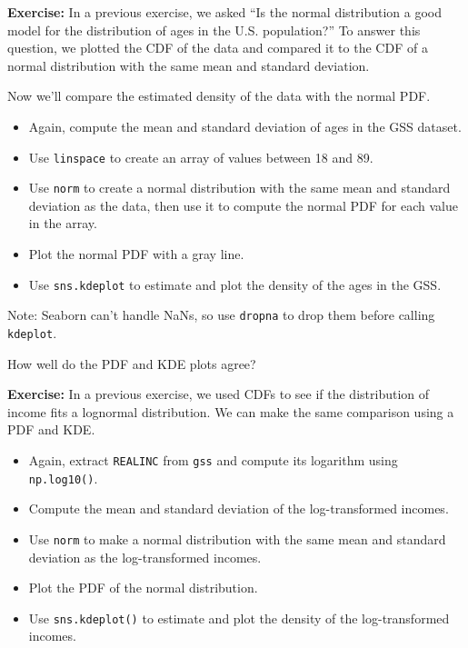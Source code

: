 \textbf{Exercise:} In a previous exercise, we asked ``Is the normal
distribution a good model for the distribution of ages in the U.S.
population?'' To answer this question, we plotted the CDF of the data
and compared it to the CDF of a normal distribution with the same mean
and standard deviation.

Now we'll compare the estimated density of the data with the normal PDF.

\begin{itemize}
\item
  Again, compute the mean and standard deviation of ages in the GSS
  dataset.
\item
  Use \passthrough{\lstinline!linspace!} to create an array of values
  between 18 and 89.
\item
  Use \passthrough{\lstinline!norm!} to create a normal distribution
  with the same mean and standard deviation as the data, then use it to
  compute the normal PDF for each value in the array.
\item
  Plot the normal PDF with a gray line.
\item
  Use \passthrough{\lstinline!sns.kdeplot!} to estimate and plot the
  density of the ages in the GSS.
\end{itemize}

Note: Seaborn can't handle NaNs, so use \passthrough{\lstinline!dropna!}
to drop them before calling \passthrough{\lstinline!kdeplot!}.

How well do the PDF and KDE plots agree?

\textbf{Exercise:} In a previous exercise, we used CDFs to see if the
distribution of income fits a lognormal distribution. We can make the
same comparison using a PDF and KDE.

\begin{itemize}
\item
  Again, extract \passthrough{\lstinline!REALINC!} from
  \passthrough{\lstinline!gss!} and compute its logarithm using
  \passthrough{\lstinline!np.log10()!}.
\item
  Compute the mean and standard deviation of the log-transformed
  incomes.
\item
  Use \passthrough{\lstinline!norm!} to make a normal distribution with
  the same mean and standard deviation as the log-transformed incomes.
\item
  Plot the PDF of the normal distribution.
\item
  Use \passthrough{\lstinline!sns.kdeplot()!} to estimate and plot the
  density of the log-transformed incomes.
\end{itemize}

